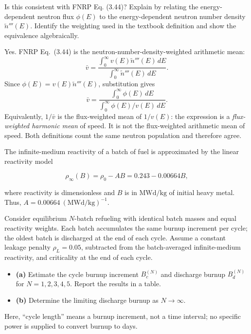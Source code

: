 Is this consistent with FNRP Eq. (3.44)? Explain by relating the
energy-dependent neutron flux \(\phi(E)\) to the energy-dependent
neutron number density \(\widetilde n'''(E)\). Identify the weighting
used in the textbook definition and show the equivalence algebraically.


\begin{adaptedsolution}
Yes. FNRP Eq.~(3.44) is the neutron-number-density-weighted arithmetic mean:
\[
\bar v=\frac{\displaystyle\int_0^\infty v(E)\widetilde n'''(E)\,dE}
{\displaystyle\int_0^\infty\widetilde n'''(E)\,dE}.
\]
Since $\phi(E)=v(E)\widetilde n'''(E)$, substitution gives
\[
\boxed{\bar v=\frac{\displaystyle\int_0^\infty\phi(E)\,dE}
{\displaystyle\int_0^\infty\phi(E)/v(E)\,dE}.}
\]
Equivalently, $1/\bar v$ is the flux-weighted mean of $1/v(E)$: the expression is a \emph{flux-weighted harmonic mean} of speed. It is not the flux-weighted arithmetic mean of speed. Both definitions count the same neutron population and therefore agree.
\end{adaptedsolution}

\newpage


The infinite-medium reactivity of a batch of fuel is approximated by the
linear reactivity model

\[
\rho_\infty(B)=\rho_0-AB=0.243-0.00664B,
\]

where reactivity is dimensionless and \(B\) is in \(\mathrm{MWd/kg}\) of
initial heavy metal. Thus, \(A=0.00664~(\mathrm{MWd/kg})^{-1}\).

Consider equilibrium \(N\)-batch refueling with identical batch masses
and equal reactivity weights. Each batch accumulates the same burnup
increment per cycle; the oldest batch is discharged at the end of each
cycle. Assume a constant leakage penalty \(\rho_L=0.05\), subtracted
from the batch-averaged infinite-medium reactivity, and criticality at
the end of each cycle.

\begin{itemize}
\setlength{\itemsep}{0pt}\setlength{\parskip}{0pt}
\item
  \textbf{(a)} Estimate the cycle burnup increment \(B_c^{(N)}\) and
  discharge burnup \(B_d^{(N)}\) for \(N=1,2,3,4,5\). Report the results
  in a table.
\item
  \textbf{(b)} Determine the limiting discharge burnup as
  \(N\to\infty\).
\end{itemize}

Here, ``cycle length'' means a burnup increment, not a time interval; no
specific power is supplied to convert burnup to days.


